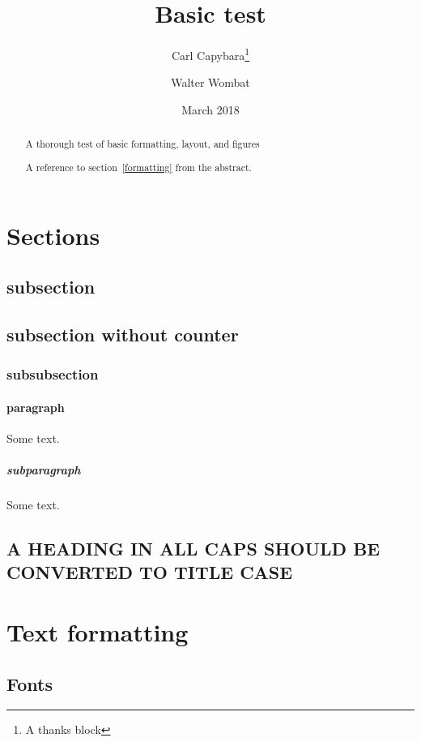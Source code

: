\documentclass{article}
\begin{document}
  \title{Basic test}
  \author{Carl Capybara\thanks{A thanks block} \and Walter Wombat}
  \date{March 2018}
  \maketitle
  \begin{abstract}
    A thorough test of basic formatting, layout, and figures

    A reference to section~\ref{formatting} from the abstract.
  \end{abstract}

  \section{Sections}

  \subsection{subsection}

  \subsection*{subsection without counter}

  \subsubsection{subsubsection}

  \paragraph{paragraph}

  Some text.

  \subparagraph{subparagraph}

  Some text.

  \subsection{A HEADING IN ALL CAPS SHOULD BE CONVERTED TO TITLE CASE}


  \section{Text formatting} \label{formatting}


  \subsection{Fonts}
\end{document}
